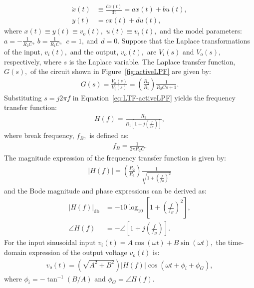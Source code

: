 %
\begin{subequations}
  \label{eq:stateSpaceRC}
\begin{align}
        \dot x(t)&\equiv \frac{\mathrm{d}x(t)}{\mathrm{dt}} =ax(t) + bu(t),\\
        y(t)& = cx(t) + du(t),
      \end{align}  
\end{subequations}
%
where $x(t)\equiv y(t) \equiv v_o(t),$  $u(t) \equiv v_i(t),$ and the model parameters: %
$a=-\frac{1}{R_2C},~b=\frac{1}{R_1C},~~c=1,~\mathrm{and}~~d=0.$
%
 Suppose that the Laplace transformations of the input, $v_i(t),$ and the output, $v_o(t),$ are $V_i(s)$ and $V_o(s),$ respectively, where $s$ is the Laplace variable. The Laplace transfer function, $G(s),$ of the circuit shown in Figure~\ref{fig:activeLPF} are given by: %
%
 \begin{align}
   G(s) = \frac{V_o(s)}{V_i(s)}= \left(\frac{R_2}{R_1}\right)\frac{1}{R_2Cs + 1}.
  \label{eq:LTF-activeLPF}
\end{align}
%
Substituting $s=j2\pi f$ in Equation~\eqref{eq:LTF-activeLPF} yields the frequency transfer function: %
%
%
\begin{align}
  H(f) = \frac{R_2}{R_1\left[1 + j\left(\frac{f}{f_B}\right)\right]},
  \label{eq:FTF-activeLPF}
\end{align}
%
where break frequency, $f_B,$ is defined as: 
\begin{align*}
  f_B = \frac{1}{2\pi R_2C}.
\end{align*}
%
The magnitude expression of the frequency transfer function is given by: %
%
  \begin{align}
    \label{eq:activeLPF-Mag}
    \left | H(f) \right | = \left(\frac{R_2}{R_1}\right)\frac{1}{\sqrt{1+\left(\frac{f}{f_B}\right)^2}}
  \end{align}
%
and the Bode magnitude and phase expressions can be derived as: 
%
\begin{subequations}
  \label{eq:BodeActiveLPF}
  \begin{align}
    \label{eq:BodeFirstOrder-MagActive}
    \left | H(f) \right |_{\si{\decibel}} &= -10\log_{10}\left[1+\left(\frac{f}{f_B}\right)^2\right],\\
            \label{eq:BodeFirstOrder-PhaseActive}
    \angle{H(f)} & = -\angle{\left[1+j\left(\frac{f}{f_B}\right)\right]}.
  \end{align}
\end{subequations}
%
For the input sinusoidal input $v_i(t) = A\cos(\omega t) + B\sin(\omega t),$ the time-domain expression of the output voltage $v_o(t)$ is: %
%
\begin{align}
  v_o(t) = \left(\sqrt{A^2+B^2}\right)\left | H(f)\right | \cos\left(\omega t + \phi_i+\phi_G\right),
  \label{eq:LPF-OutActive}
\end{align}
%
where $\phi_i = -\tan^{-1}(B/A)$ and $\phi_G = \angle{H(f)}.$

